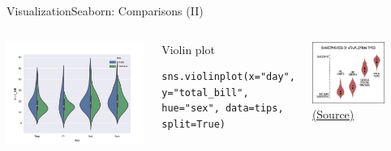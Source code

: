 \documentclass[10pt,compress]{beamer} %
\begin{document}
\begin{frame}[fragile]{Visualization}{Seaborn: Comparisons (II)}
	\begin{columns}
	\includegraphics[width=\textwidth]{figs/sns-violin2.png}\\
	\begin{exampleblock}{\footnotesize{Violin plot}}
	\vspace{-0.2cm} 
	\begin{lstlisting}[basicstyle=\tiny]
	sns.violinplot(x="day", y="total_bill", hue="sex", data=tips, split=True)
	\end{lstlisting}
	\vspace{-0.2cm} 
	\end{exampleblock}

	\centering \includegraphics[width=0.7\textwidth]{figs/violin_plots.png}\\
	\tiny \centering \href{https://xkcd.com/1967/}{(Source)}

	\end{columns}
\end{frame}
\end{document}
